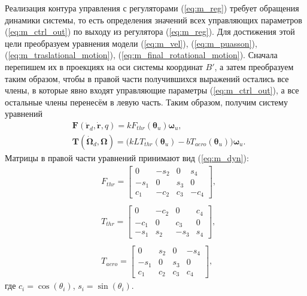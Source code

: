 Реализация контура управления с регуляторами (\ref{eq:m_reg}) требует обращения динамики системы, то есть определения значений всех управляющих параметров (\ref{eq:m_ctrl_out}) по выходу из регулятора (\ref{eq:m_reg}).
Для достижения этой цели преобразуем уравнения модели (\ref{eq:m_vel}), (\ref{eq:m_puasson}), (\ref{eq:m_traslational_motion}), (\ref{eq:m_final_rotational_motion}).
Сначала перепишем их в проекциях на оси системы координат $B'$, а затем
преобразуем таким образом, чтобы в правой части получившихся выражений остались все члены, в которые явно входят управляющие параметры (\ref{eq:m_ctrl_out}), а все остальные члены перенесём в левую часть. Таким образом, получим систему уравнений
\begin{equation} \label{eq:m_dyn}
\begin{aligned}
&\bm F(\ddot{\bm r}_d, \dot{\bm r}, q) = k F_{thr} (\bm \theta_u) \bm \omega_u,\\
&\bm T(\dot{\bm \Omega}_d, \bm\Omega) = \Big(
kLT_{thr}(\bm\theta_u) - bT_{aero}(\bm\theta_u)
\Big)
\bm \omega_u.
\end{aligned}
\end{equation}
Матрицы в правой части уравнений принимают вид (\ref{eq:m_dyn}):
\begin{equation} \label{eq:m_dyn_matrixes}
\begin{aligned}
&F_{thr} =
\begin{bmatrix}
0&-s_2&0&s_4\\
-s_1&0&s_3&0\\
c_1&-c_2&c_3&-c_4
\end{bmatrix},
\\
\phantom{}
\\
&T_{thr} =
\begin{bmatrix}
0&-c_2&0&c_4\\
-c_1&0&c_3&0\\
-s_1&s_2&-s_3&s_4
\end{bmatrix},
\\
\phantom{}
\\
&T_{aero} =
\begin{bmatrix}
0&s_2&0&-s_4\\
-s_1&0&s_3&0\\
c_1&c_2&c_3&c_4
\end{bmatrix},
\end{aligned}
\end{equation}
где $c_i = \cos(\theta_i)$, $s_i = \sin(\theta_i)$.

